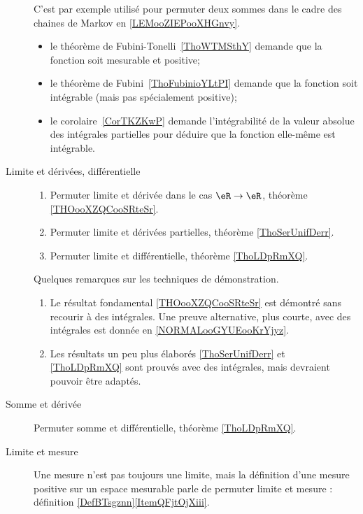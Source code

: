 \begin{description}
        C'est par exemple utilisé pour permuter deux sommes dans le cadre des chaines de Markov en \ref{LEMooZIEPooXHGnvy}.
\begin{itemize}
    \item
        le théorème de Fubini-Tonelli~\ref{ThoWTMSthY} demande que la fonction soit mesurable et positive;
    \item
        le théorème de Fubini~\ref{ThoFubinioYLtPI} demande que la fonction soit intégrable (mais pas spécialement positive);
    \item
        le corolaire~\ref{CorTKZKwP} demande l'intégrabilité de la valeur absolue des intégrales partielles pour déduire que la fonction elle-même est intégrable.
\end{itemize}

\item[Limite et dérivées, différentielle]
    \begin{enumerate}
        \item
            Permuter limite et dérivée dans le cas \( \eR\to \eR\), théorème \ref{THOooXZQCooSRteSr}.
        \item
 Permuter limite et dérivées partielles, théorème \ref{ThoSerUnifDerr}.
        \item
            Permuter limite et différentielle, théorème \ref{ThoLDpRmXQ}.
    \end{enumerate}
    Quelques remarques sur les techniques de démonstration.
    \begin{enumerate}
        \item
            Le résultat fondamental \ref{THOooXZQCooSRteSr} est démontré sans recourir à des intégrales. Une preuve alternative, plus courte, avec des intégrales est donnée en \ref{NORMALooGYUEooKrYjyz}.
        \item
            Les résultats un peu plus élaborés \ref{ThoSerUnifDerr} et \ref{ThoLDpRmXQ} sont prouvés avec des intégrales, mais devraient pouvoir être adaptés.
    \end{enumerate}
\item[Somme et dérivée]
    Permuter somme et différentielle, théorème \ref{ThoLDpRmXQ}.
\item[Limite et mesure]
    Une mesure n'est pas toujours une limite, mais la définition d'une mesure positive sur un espace mesurable parle de permuter limite et mesure : définition \ref{DefBTsgznn}\ref{ItemQFjtOjXiii}.
\end{description}


